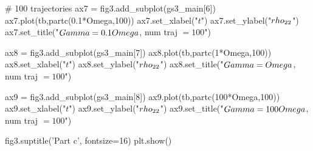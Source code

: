 \begin{python}
# 100 trajectories
ax7 = fig3.add_subplot(gs3_main[6])
ax7.plot(tb,partc(0.1*Omega,100))
ax7.set_xlabel("$t$")
ax7.set_ylabel("$\\rho_{22}$")
ax7.set_title("$\\Gamma = 0.1\\Omega$, num traj $= 100$")

ax8 = fig3.add_subplot(gs3_main[7])
ax8.plot(tb,partc(1*Omega,100))
ax8.set_xlabel("$t$")
ax8.set_ylabel("$\\rho_{22}$")
ax8.set_title("$\\Gamma = \\Omega$, num traj $= 100$")

ax9 = fig3.add_subplot(gs3_main[8])
ax9.plot(tb,partc(100*Omega,100))
ax9.set_xlabel("$t$")
ax9.set_ylabel("$\\rho_{22}$")
ax9.set_title("$\\Gamma = 100\\Omega$, num traj $= 100$")

fig3.suptitle('Part c', fontsize=16)
plt.show()
\end{python}